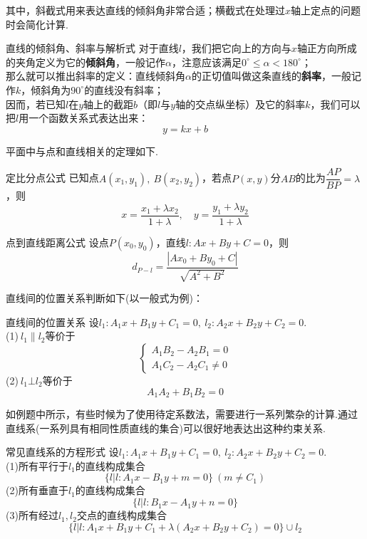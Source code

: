 \documentclass[lang=cn, zihao=5]{elegantbook}
\begin{document}
其中，斜截式用来表达直线的倾斜角非常合适；横截式在处理过$x$轴上定点的问题时会简化计算.

\begin{definition}{直线的倾斜角、斜率与解析式}
    对于直线$l$，我们把它向上的方向与$x$轴正方向所成的夹角定义为它的\textbf{倾斜角}，一般记作$\alpha$，注意应该满足$0^{\circ} \leq \alpha < 180^{\circ}$；\\
    那么就可以推出斜率的定义：直线倾斜角$\alpha$的正切值叫做这条直线的\textbf{斜率}，一般记作$k$，倾斜角为$90^{\circ}$的直线没有斜率；\\
    因而，若已知$l$在$y$轴上的截距$b$（即$l$与$y$轴的交点纵坐标）及它的斜率$k$，我们可以把$l$用一个函数关系式表达出来：$$y=kx+b$$
\end{definition}

平面中与点和直线相关的定理如下.

\begin{theorem}{定比分点公式}
	已知点$A(x_1,y_1),~B(x_2,y_2)$，若点$P(x,y)$分$AB$的比为$\dfrac{AP}{BP}=\lambda$，则$$x=\frac{x_1+\lambda x_2}{1+\lambda}, \quad y = \frac{y_1+\lambda y_2}{1+\lambda}$$
\end{theorem}

\begin{theorem}{点到直线距离公式}
	设点$P(x_0,y_0)$，直线$l:Ax+By+C=0$，则$$d_{P-l}=\frac{|Ax_0+By_0+C|}{\sqrt{A^2+B^2}}$$
\end{theorem}

直线间的位置关系判断如下(以一般式为例)：

\begin{proposition}{直线间的位置关系}
	设$l_1:A_1x+B_1y+C_1=0,~l_2:A_2x+B_2y+C_2=0$. \\
	(1)$~l_1 \parallel l_2$等价于$$\begin{cases}
		A_1B_2-A_2B_1=0 \\
		A_1C_2-A_2C_1 \neq 0
	\end{cases}$$
	(2)$~l_1 \bot l_2$等价于$$A_1A_2+B_1B_2=0$$
\end{proposition}

如例题中所示，有些时候为了使用待定系数法，需要进行一系列繁杂的计算.通过直线系(一系列具有相同性质直线的集合)可以很好地表达出这种约束关系.

\begin{proposition}{常见直线系的方程形式}
	设$l_1:A_1x+B_1y+C_1=0,~l_2:A_2x+B_2y+C_2=0$. \\
	(1)所有平行于$l_1$的直线构成集合$$\{ l|l:A_1x-B_1y+m=0 \}~(m \neq C_1)$$
	(2)所有垂直于$l_1$的直线构成集合$$\{ l|l:B_1x-A_1y+n=0 \}$$
	(3)所有经过$l_1,l_2$交点的直线构成集合$$\{ l|l:A_1x+B_1y+C_1+\lambda (A_2x+B_2y+C_2)=0 \} \cup l_2$$
\end{proposition}
\end{document}
